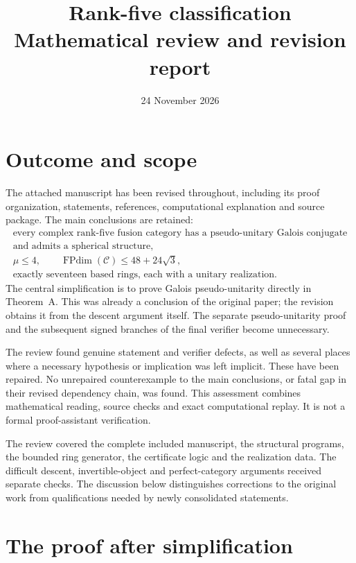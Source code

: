 \documentclass[11pt,a4paper]{article}
\title{Rank-five classification\\[4pt]\large Mathematical review and revision report}
\author{}
\date{24 November 2026}
\newcommand{\FPdim}{\operatorname{FPdim}}
\begin{document}
\maketitle

\section{Outcome and scope}

The attached manuscript has been revised throughout, including its proof
organization, statements, references, computational explanation and source
package. The main conclusions are retained:
\[
\begin{gathered}
\text{every complex rank-five fusion category has a pseudo-unitary Galois
conjugate}\\
\text{and admits a spherical structure},\\
\mu\le4,\qquad \FPdim(\mathcal C)\le48+24\sqrt3,\\
\text{exactly seventeen based rings, each with a unitary realization}.
\end{gathered}
\]
The central simplification is to prove Galois pseudo-unitarity directly in
Theorem~A. This was already a conclusion of the original paper; the revision
obtains it from the descent argument itself. The separate pseudo-unitarity
proof and the subsequent signed branches of the final verifier become
unnecessary.

The review found genuine statement and verifier defects, as well as several
places where a necessary hypothesis or implication was left implicit.
These have been repaired. No unrepaired counterexample to the main
conclusions, or fatal gap in their revised dependency chain, was found.
This assessment combines mathematical reading, source checks and exact
computational replay. It is not a formal proof-assistant verification.

The review covered the complete included manuscript, the structural
programs, the bounded ring generator, the certificate logic and the
realization data. The difficult descent, invertible-object and perfect-category
arguments received separate checks. The discussion below distinguishes
corrections to the original work from qualifications needed by newly
consolidated statements.

\section{The proof after simplification}
\end{document}
